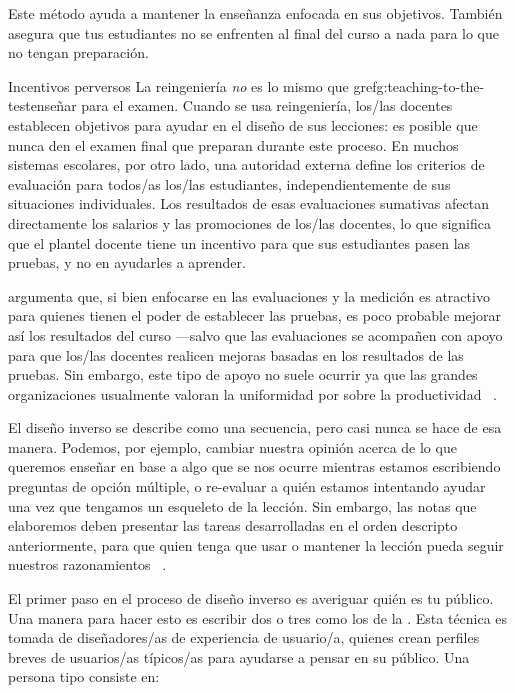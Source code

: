 Este método ayuda a mantener la enseñanza enfocada en sus objetivos.
También asegura que tus estudiantes no se enfrenten al final del curso
a nada para lo que no tengan preparación.
 
\begin{aside}{Incentivos perversos}
La reingeniería \emph{no} es lo mismo que gref{g:teaching-to-the-test}{enseñar para el examen}.
Cuando se usa reingeniería,
los/las docentes establecen objetivos para ayudar en el diseño de sus lecciones:
es posible que nunca den el examen final que preparan durante este proceso.
En muchos sistemas escolares,
por otro lado,
una autoridad externa define los criterios de evaluación para todos/as los/las estudiantes,
independientemente de sus situaciones individuales.
Los resultados de esas evaluaciones sumativas afectan directamente los salarios y las promociones de los/las docentes,
lo que significa que el plantel docente tiene un incentivo para que sus estudiantes pasen las pruebas, y no en ayudarles a aprender.
 
\cite{Gree2014} argumenta que, si bien enfocarse en las evaluaciones y la medición es atractivo para quienes tienen el poder de establecer las pruebas, es poco probable mejorar así los resultados del curso ---salvo que las evaluaciones se acompañen con apoyo para que los/las docentes realicen mejoras basadas en los resultados de las pruebas.
Sin embargo, este tipo de apoyo no suele ocurrir ya que
las grandes organizaciones usualmente valoran la uniformidad por sobre la productividad ~\cite{Scot1998}.
\end{aside}
 
El diseño inverso se describe como una secuencia,
pero casi nunca se hace de esa manera.
Podemos,
por ejemplo, cambiar nuestra opinión acerca de lo que queremos enseñar
en base a algo que se nos ocurre mientras estamos escribiendo preguntas de opción múltiple,
o re-evaluar a quién estamos intentando ayudar una vez que tengamos un esqueleto de la lección.
Sin embargo,
las notas que elaboremos deben presentar las tareas desarrolladas en el orden descripto anteriormente, para que quien tenga que usar o mantener la lección pueda seguir nuestros razonamientos
~\cite{Parn1986}.
 
 
El primer paso en el proceso de diseño inverso es averiguar quién es tu público.
Una manera para hacer esto es escribir dos o tres
como los de la .
Esta técnica es tomada de diseñadores/as de experiencia de usuario/a,
quienes crean perfiles breves de usuarios/as típicos/as
para ayudarse a pensar en su público.
Una persona tipo consiste en:
 
